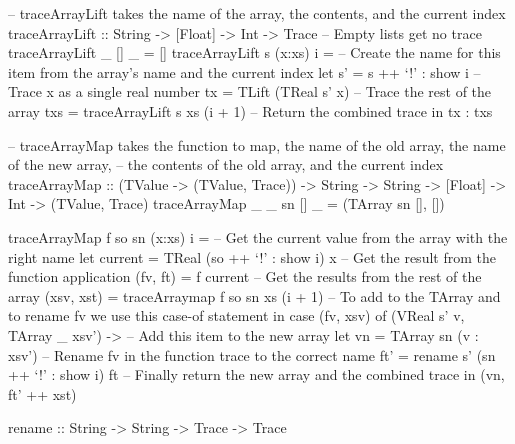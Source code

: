        \begin{haskell}[caption=Tracing array instantiation and array mapping, label=lst:trace_map, gobble=12]
            -- traceArrayLift takes the name of the array, the contents, and the current index
            traceArrayLift :: String -> [Float] -> Int -> Trace
            -- Empty lists get no trace
            traceArrayLift _ []     _ = []
            traceArrayLift s (x:xs) i = 
                -- Create the name for this item from the array's name and the current index
                let s' = s ++ `!' : show i
                -- Trace x as a single real number
                    tx = TLift (TReal s' x)
                -- Trace the rest of the array
                    txs = traceArrayLift s xs (i + 1)
                -- Return the combined trace
                in  tx : txs

            -- traceArrayMap takes the function to map, the name of the old array, the name of the new array, 
            -- the contents of the old array, and the current index
            traceArrayMap :: (TValue -> (TValue, Trace)) -> String -> String -> [Float]
                -> Int -> (TValue, Trace)
            traceArrayMap _ _  sn []     _ = (TArray sn [], [])
            
            traceArrayMap f so sn (x:xs) i =
                -- Get the current value from the array with the right name
                let current  = TReal (so ++ `!' : show i) x
                -- Get the result from the function application
                    (fv, ft) = f current
                -- Get the results from the rest of the array
                    (xsv, xst) = traceArraymap f so sn xs (i + 1)
                -- To add to the TArray and to rename fv we use this case-of statement
                in  case (fv, xsv) of
                    (VReal s' v, TArray _ xsv') ->
                        -- Add this item to the new array
                        let vn = TArray sn (v : xsv')
                        -- Rename fv in the function trace to the correct name
                            ft' = rename s' (sn ++ `!' : show i) ft
                        -- Finally return the new array and the combined trace
                        in  (vn, ft' ++ xst)

            rename :: String -> String -> Trace -> Trace
        \end{haskell}

